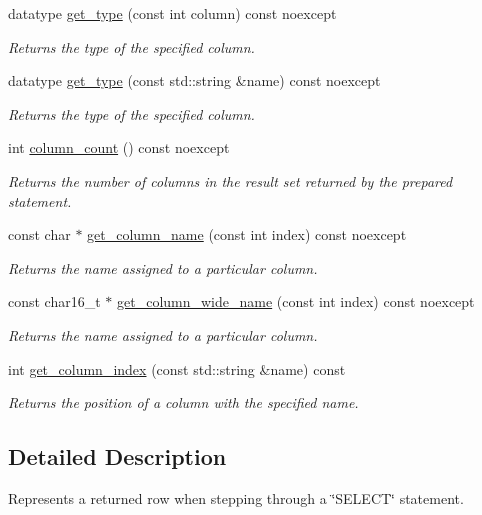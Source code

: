 \begin{DoxyCompactItemize}
datatype \hyperlink{a00010_a2b8269e0f9387afa36ab90eb55899dc4}{get\-\_\-type} (const int column) const noexcept
\begin{DoxyCompactList}\small\item\em Returns the type of the specified column. \end{DoxyCompactList}\item 
datatype \hyperlink{a00010_ac5ab606cf12aa4d2c9a183998420df44}{get\-\_\-type} (const std\-::string \&name) const noexcept
\begin{DoxyCompactList}\small\item\em Returns the type of the specified column. \end{DoxyCompactList}\item 
int \hyperlink{a00010_a7390afddbb1edc788f0afc6ce41f4562}{column\-\_\-count} () const noexcept
\begin{DoxyCompactList}\small\item\em Returns the number of columns in the result set returned by the prepared statement. \end{DoxyCompactList}\item 
const char $\ast$ \hyperlink{a00010_ad4c33f9b700a47c08f54e7b65afd34f2}{get\-\_\-column\-\_\-name} (const int index) const noexcept
\begin{DoxyCompactList}\small\item\em Returns the name assigned to a particular column. \end{DoxyCompactList}\item 
const char16\-\_\-t $\ast$ \hyperlink{a00010_aa7f2f528b10da75672e55fbc36566f9c}{get\-\_\-column\-\_\-wide\-\_\-name} (const int index) const noexcept
\begin{DoxyCompactList}\small\item\em Returns the name assigned to a particular column. \end{DoxyCompactList}\item 
int \hyperlink{a00010_aaca43590a209c2c7a0f7420c8a6c47b3}{get\-\_\-column\-\_\-index} (const std\-::string \&name) const
\begin{DoxyCompactList}\small\item\em Returns the position of a column with the specified name. \end{DoxyCompactList}\end{DoxyCompactItemize}


\subsection{Detailed Description}
Represents a returned row when stepping through a \char`\"{}\-S\-E\-L\-E\-C\-T\char`\"{} statement. 


